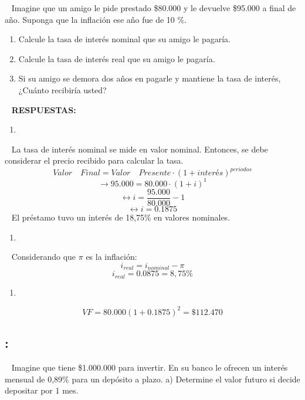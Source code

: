 \documentclass[
  letterpaper,
  DIV=11,
  numbers=noendperiod]{scrreport}
\providecommand{\tightlist}{%
  \setlength{\itemsep}{0pt}\setlength{\parskip}{0pt}}\usepackage{longtable,booktabs,array}
\begin{document}
~ Imagine que un amigo le pide prestado \$80.000 y le devuelve \$95.000
a final de año. Suponga que la inflación ese año fue de 10 \%.

\begin{enumerate}
\def\labelenumi{\alph{enumi})}
\item
  Calcule la tasa de interés nominal que su amigo le pagaría.
\item
  Calcule la tasa de interés real que su amigo le pagaría.
\item
  Si su amigo se demora dos años en pagarle y mantiene la tasa de
  interés, ¿Cuánto recibiría usted?
\end{enumerate}

~ \textbf{RESPUESTAS:}

\begin{enumerate}
\def\labelenumi{\alph{enumi})}
\tightlist
\item
\end{enumerate}

~ La tasa de interés nominal se mide en valor nominal. Entonces, se debe
considerar el precio recibido para calcular la tasa.
\[Valor\quad Final = Valor\quad Presente \cdot (1+interés)^{periodos} \]
\[\rightarrow 95.000=80.000 \cdot (1+i)^1  \]
\[\leftrightarrow i = \frac{95.000}{80.000}-1\]
\[\leftrightarrow i=0.1875\] ~ El préstamo tuvo un interés de 18,75\% en
valores nominales.

\begin{enumerate}
\def\labelenumi{\alph{enumi})}
\setcounter{enumi}{1}
\tightlist
\item
\end{enumerate}

~ Considerando que \(\pi\) es la inflación:
\[i_{real} = i_{nominal} - \pi \] \[i_{real} = 0.0875 = 8,75\% \]

\begin{enumerate}
\def\labelenumi{\alph{enumi})}
\setcounter{enumi}{2}
\tightlist
\item
\end{enumerate}

\[VF = 80.000(1+0.1875)^2 = \$ 112.470\]

\hypertarget{section-39}{%
\subsection{:}\label{section-39}}

~ Imagine que tiene \$1.000.000 para invertir. En su banco le ofrecen un
interés mensual de 0,89\% para un depósito a plazo. a) Determine el
valor futuro si decide depositar por 1 mes.
\end{document}
